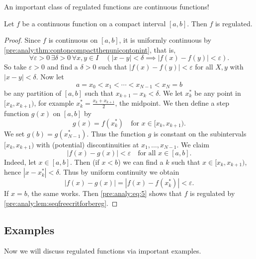 \documentclass[10pt, a4paper]{article}
\begin{document}
An important class of regulated functions are continuous functions!

\begin{theorem}
    Let $f$ be a continuous function on a compact interval $[a, b]$.
    Then $f$ is regulated.
    \begin{proof}
        Since $f$ is continuous on $[a, b]$,
        it is uniformly continuous by \autoref{pre:analy:thm:contoncompactthenunicontonint},
        that is,
        \[
        \forall\varepsilon > 0\,\exists\delta > 0\,\forall x, y \in I\quad(|x - y| < \delta \implies |f(x) - f(y)| < \varepsilon).
        \]
        So take $\varepsilon > 0$ and find a $\delta > 0$ such that $|f(x) - f(y)| < \varepsilon$ for all $X, y$ with $|x - y| < \delta$.
        Now let
        \[
        a = x_0 < x_1 < \dotsi < x_{N - 1} < x_N = b
        \]
        be any partition of $[a, b]$ such that $x_{k + 1} - x_k < \delta$.
        We let $x_k ^ {*}$ be any point in $[x_k, x_{k + 1})$,
        for example $x_k ^ {*} = \frac{x_k + x_{k + 1}}{2}$,
        the midpoint.
        We then define a step function $g(x)$ on $[a, b]$ by
        \[
        g(x) = f(x_k ^ {*})\quad\text{for } x \in [x_k, x_{k + 1}).
        \]
        We set $g(b) = g(x_{N - 1} ^ {*})$.
        Thus the function $g$ is constant on the subintervals $[x_k, x_{k + 1})$ with
        (potential)
        discontinuities at $x_1, \dotsc, x_{N - 1}$.
        We claim
        \begin{equation}\label{pre:analy:eq:5}
            |f(x) - g(x)| < \varepsilon\quad\text{for all } x \in [a, b].
        \end{equation}
        Indeed,
        let $x \in [a, b]$.
        Then
        (if $x < b$)
        we can find a $k$ such that $x \in [x_k, x_{k + 1})$,
        hence $|x - x_k ^ {*}| < \delta$.
        Thus by uniform continuity we obtain
        \[
        |f(x) - g(x)| = |f(x) - f(x_k ^ {*})| < \varepsilon.
        \]
        If $x = b$,
        the same works.
        Then \eqref{pre:analy:eq:5} shows that $f$ is regulated by \autoref{pre:analy:lem:seqfreecritforbereg}.
    \end{proof}
\end{theorem}

\subsection{Examples}
Now we will discuss regulated functions via important examples.
\end{document}
